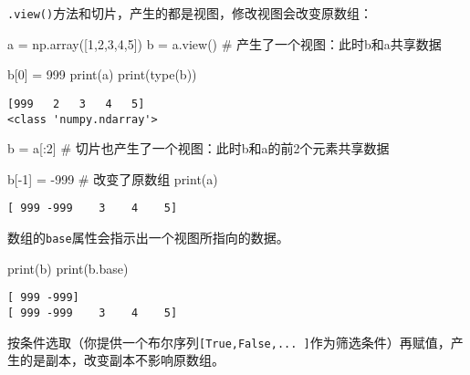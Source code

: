 \documentclass[
  letterpaper,
  DIV=11,
  numbers=noendperiod]{scrreprt}
\newenvironment{Shaded}{\begin{snugshade}}{\end{snugshade}}
\newcommand{\BuiltInTok}[1]{\textcolor[rgb]{0.00,0.23,0.31}{#1}}
\newcommand{\CommentTok}[1]{\textcolor[rgb]{0.37,0.37,0.37}{#1}}
\newcommand{\DecValTok}[1]{\textcolor[rgb]{0.68,0.00,0.00}{#1}}
\newcommand{\NormalTok}[1]{\textcolor[rgb]{0.00,0.23,0.31}{#1}}
\newcommand{\OperatorTok}[1]{\textcolor[rgb]{0.37,0.37,0.37}{#1}}
\begin{document}
\texttt{.view()}方法和切片，产生的都是视图，修改视图会改变原数组：

\begin{Shaded}
\begin{Highlighting}[]
\NormalTok{a }\OperatorTok{=}\NormalTok{ np.array([}\DecValTok{1}\NormalTok{,}\DecValTok{2}\NormalTok{,}\DecValTok{3}\NormalTok{,}\DecValTok{4}\NormalTok{,}\DecValTok{5}\NormalTok{])}
\NormalTok{b }\OperatorTok{=}\NormalTok{ a.view() }\CommentTok{\# 产生了一个视图：此时b和a共享数据}

\NormalTok{b[}\DecValTok{0}\NormalTok{] }\OperatorTok{=} \DecValTok{999}
\BuiltInTok{print}\NormalTok{(a)}
\BuiltInTok{print}\NormalTok{(}\BuiltInTok{type}\NormalTok{(b))}
\end{Highlighting}
\end{Shaded}

\begin{verbatim}
[999   2   3   4   5]
<class 'numpy.ndarray'>
\end{verbatim}

\begin{Shaded}
\begin{Highlighting}[]
\NormalTok{b }\OperatorTok{=}\NormalTok{ a[:}\DecValTok{2}\NormalTok{]  }\CommentTok{\# 切片也产生了一个视图：此时b和a的前2个元素共享数据}

\NormalTok{b[}\OperatorTok{{-}}\DecValTok{1}\NormalTok{] }\OperatorTok{=} \OperatorTok{{-}}\DecValTok{999} \CommentTok{\# 改变了原数组}
\BuiltInTok{print}\NormalTok{(a)}
\end{Highlighting}
\end{Shaded}

\begin{verbatim}
[ 999 -999    3    4    5]
\end{verbatim}

数组的\texttt{base}属性会指示出一个视图所指向的数据。

\begin{Shaded}
\begin{Highlighting}[]
\BuiltInTok{print}\NormalTok{(b)}
\BuiltInTok{print}\NormalTok{(b.base) }
\end{Highlighting}
\end{Shaded}

\begin{verbatim}
[ 999 -999]
[ 999 -999    3    4    5]
\end{verbatim}

按条件选取（你提供一个布尔序列\texttt{{[}True,False,...\ {]}}作为筛选条件）再赋值，产生的是副本，改变副本不影响原数组。
\end{document}
